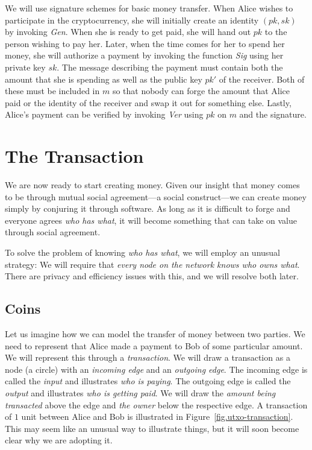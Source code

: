 We will use signature schemes for basic money transfer. When Alice wishes to participate
in the cryptocurrency, she will initially create an identity $(pk, sk)$ by invoking
\emph{Gen}. When she is ready to get paid, she will hand out $pk$ to the person wishing to
pay her. Later, when the time comes for her to spend her money, she will authorize a payment
by invoking the function \emph{Sig} using her private key $sk$. The message describing
the payment must contain both the amount that she is spending as well as the public key
$pk'$ of the receiver. Both of these must be included in $m$ so that nobody can forge
the amount that Alice paid or the identity of the receiver and swap it out for something
else. Lastly, Alice's payment can be verified by invoking \emph{Ver} using $pk$ on $m$ and the signature.

\section{The Transaction}
We are now ready to start creating money. Given our insight that money comes to be
through mutual social agreement---a social construct---we can create money simply by conjuring
it through software. As long as it is difficult to forge and everyone agrees
\emph{who has what}, it will become something that can take on value through social
agreement.

To solve the problem of knowing \emph{who has what}, we will employ an unusual strategy:
We will require that \emph{every node on the network knows who owns what}. There are privacy
and efficiency issues with this, and we will resolve both later.

\subsection*{Coins}

Let us imagine how we can model the transfer of money between two parties. We need to represent
that Alice made a payment to Bob of some particular amount. We will represent this through a
\emph{transaction}. We will draw a transaction as a node (a circle) with an \emph{incoming edge}
and an \emph{outgoing edge}. The incoming edge is called the \emph{input} and
illustrates \emph{who is paying}. The outgoing
edge is called the \emph{output} and illustrates
\emph{who is getting paid}. We will draw the \emph{amount being transacted}
above the edge and \emph{the owner} below the respective edge. A transaction of $1$ unit
between Alice and Bob is illustrated in Figure~\ref{fig.utxo-transaction}. This may seem like
an unusual way to illustrate things, but it will soon become clear why we are adopting it.

